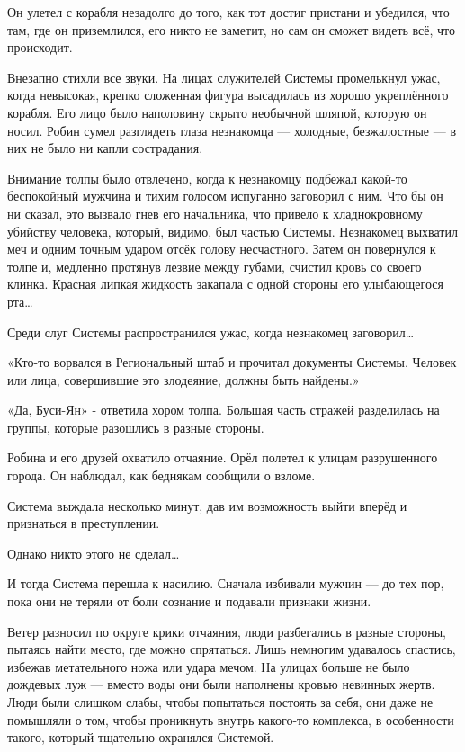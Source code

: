 \documentclass[a4paper,12pt]{book}
\begin{document}
\par
Он улетел с корабля незадолго до того, как тот достиг пристани и убедился, что там, где он приземлился, его никто не заметит, но сам он сможет видеть всё, что происходит.\\
\par
Внезапно стихли все звуки. На лицах служителей Системы промелькнул ужас, когда невысокая, крепко сложенная фигура высадилась из хорошо укреплённого корабля. Его лицо было наполовину скрыто необычной шляпой, которую он носил. Робин сумел разглядеть глаза незнакомца — холодные, безжалостные — в них не было ни капли сострадания.
\par
Внимание толпы было отвлечено, когда к незнакомцу подбежал какой-то беспокойный мужчина и тихим голосом испуганно заговорил с ним. Что бы он ни сказал, это вызвало гнев его начальника, что привело к хладнокровному убийству человека, который, видимо, был частью Системы. Незнакомец выхватил меч и одним точным ударом отсёк голову несчастного. Затем он повернулся к толпе и, медленно протянув лезвие между губами, счистил кровь со своего клинка. Красная липкая жидкость закапала с одной стороны его улыбающегося рта…
\par
Среди слуг Системы распространился ужас, когда незнакомец заговорил…
\par
«Кто-то ворвался в Региональный штаб и прочитал документы Системы. Человек или лица, совершившие это злодеяние, должны быть найдены.»
\par
«Да, Буси-Ян» - ответила хором толпа. Большая часть стражей разделилась на группы, которые разошлись в разные стороны.
\par
Робина и его друзей охватило отчаяние. Орёл полетел к улицам разрушенного города. Он наблюдал, как беднякам сообщили о взломе.
\par
Система выждала несколько минут, дав им возможность выйти вперёд и признаться в преступлении.
\par
Однако никто этого не сделал…
\par
И тогда Система перешла к насилию. Сначала избивали мужчин — до тех пор, пока они не теряли от боли сознание и подавали признаки жизни.
\par
Ветер разносил по округе крики отчаяния, люди разбегались в разные стороны, пытаясь найти место, где можно спрятаться. Лишь немногим удавалось спастись, избежав метательного ножа или удара мечом. На улицах больше не было дождевых луж — вместо воды они были наполнены кровью невинных жертв. Люди были слишком слабы, чтобы попытаться постоять за себя, они даже не помышляли о том, чтобы проникнуть внутрь какого-то комплекса, в особенности такого, который тщательно охранялся Системой.\\
\end{document}
